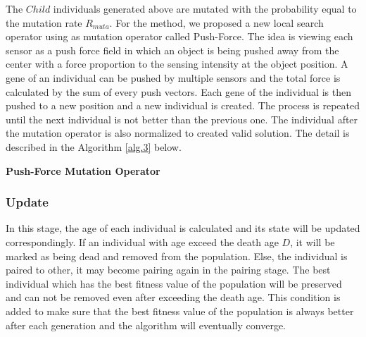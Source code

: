 \documentclass[final]{elsarticle}
\begin{document}
The $Child$ individuals generated above are mutated with the probability equal to the mutation rate $R_{muta}$. For the method, we proposed a new local search operator using as mutation operator called Push-Force. The idea is viewing each sensor as a push force field in which an object is being pushed away from the center with a force proportion to the sensing intensity at the object position. A gene of an individual can be pushed by multiple sensors and the total force is calculated by the sum of every push vectors. Each gene of the individual is then pushed to a new position and a new individual is created. The process is repeated until the next individual is not better than the previous one. The individual after the mutation operator is also normalized to created valid solution. The detail is described in the Algorithm \ref{alg.3} below.
\begin{algorithm}[H]
	\SetAlgoLined
	\caption{\textbf{Push-Force Mutation Operator}} 
	\label{alg.3}
\end{algorithm} 

\subsubsection{Update}

In this stage, the age of each individual is calculated and its state will be updated correspondingly. If an individual with age exceed the death age $D$, it will be marked as being dead and removed from the population. Else, the individual is paired to other, it may become pairing again in the pairing stage. The best individual which has the best fitness value of the population will be preserved and can not be removed even after exceeding the death age. This condition is added to make sure that the best fitness value of the population is always better after each generation and the algorithm will eventually converge.
\end{document}
